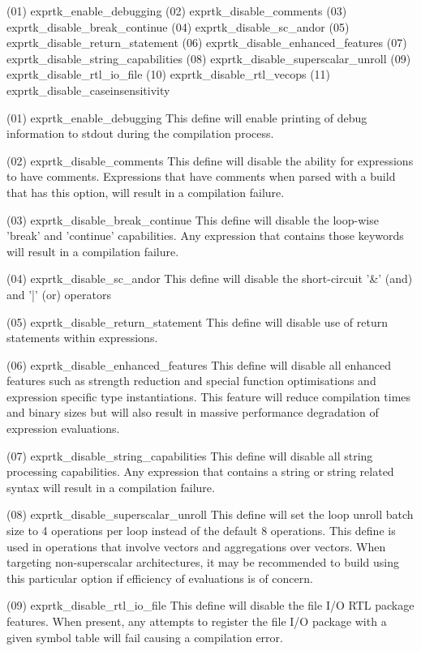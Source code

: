 {(01) exprtk\_enable\_debugging
(02) exprtk\_disable\_comments
(03) exprtk\_disable\_break\_continue
(04) exprtk\_disable\_sc\_andor
(05) exprtk\_disable\_return\_statement
(06) exprtk\_disable\_enhanced\_features
(07) exprtk\_disable\_string\_capabilities
(08) exprtk\_disable\_superscalar\_unroll
(09) exprtk\_disable\_rtl\_io\_file
(10) exprtk\_disable\_rtl\_vecops
(11) exprtk\_disable\_caseinsensitivity


(01) exprtk\_enable\_debugging
This define will enable printing of debug information to stdout during
the compilation process.

(02) exprtk\_disable\_comments
This define will disable the ability for expressions to have comments.
Expressions that have comments when parsed with a build that has  this
option, will result in a compilation failure.

(03) exprtk\_disable\_break\_continue
This  define  will  disable  the  loop-wise  'break'  and   'continue'
capabilities. Any expression that contains those keywords will  result
in a compilation failure.

(04) exprtk\_disable\_sc\_andor
This define  will disable  the short-circuit  '\&' (and)  and '|'  (or)
operators

(05) exprtk\_disable\_return\_statement
This define will disable use of return statements within expressions.

(06) exprtk\_disable\_enhanced\_features
This  define  will  disable all  enhanced  features  such as  strength
reduction and special  function optimisations and  expression specific
type instantiations.  This feature  will reduce  compilation times and
binary sizes but will  also result in massive  performance degradation
of expression evaluations.

(07) exprtk\_disable\_string\_capabilities
This  define  will  disable all  string  processing  capabilities. Any
expression that contains a string or string related syntax will result
in a compilation failure.

(08) exprtk\_disable\_superscalar\_unroll
This define will set  the loop unroll batch  size to 4 operations  per
loop  instead of  the default  8 operations.  This define  is used  in
operations that  involve vectors  and aggregations  over vectors. When
targeting  non-superscalar  architectures, it  may  be recommended  to
build using this particular option if efficiency of evaluations is  of
concern.

(09) exprtk\_disable\_rtl\_io\_file
This  define will  disable  the  file I/O  RTL package  features. When
present, any  attempts to register  the file I/O package with  a given
symbol table will fail causing a compilation error.

}
